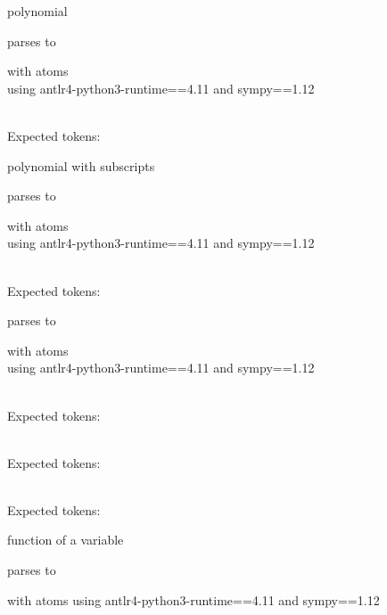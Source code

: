 \documentclass{article}
\begin{document}
\hrulefill

polynomial
    
parses to

with atoms 
\\
using antlr4-python3-runtime==4.11 and sympy==1.12

\ \\
Expected tokens: 


\hrulefill

polynomial with subscripts
  
parses to

with atoms 
\\
using antlr4-python3-runtime==4.11 and sympy==1.12

\ \\
Expected tokens:



\hrulefill



parses to

with atoms 
\\
using antlr4-python3-runtime==4.11 and sympy==1.12

\ \\
Expected tokens: 


\hrulefill





\ \\
Expected tokens: 


\hrulefill






\ \\
Expected tokens: 


\hrulefill


function of a variable

parses to

with atoms
using antlr4-python3-runtime==4.11 and sympy==1.12
\end{document}
